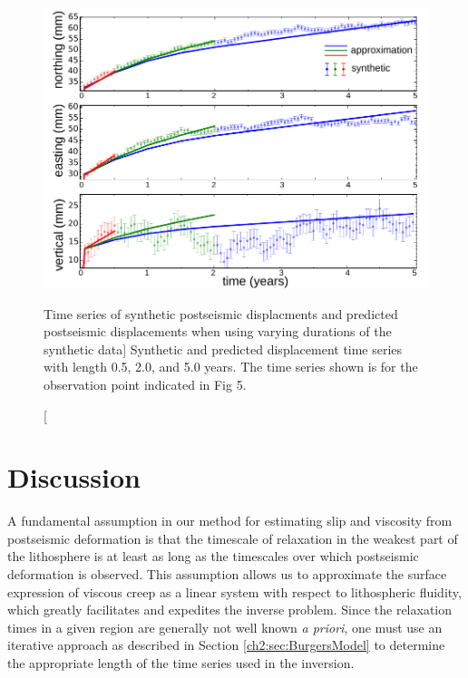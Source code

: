 \begin{figure}
\includegraphics{ch2/figures/Fig10.pdf}
\caption
[Time series of synthetic postseismic displacments and predicted
postseismic displacements when using varying durations of the
synthetic data]
{Synthetic and predicted displacement time series with
length 0.5, 2.0, and 5.0 years.  The time series shown is for the
observation point indicated in Fig 5.}
\label{ch2:fig:10}
\end{figure}

\section{Discussion}
A fundamental assumption in our method for estimating slip and
viscosity from postseismic deformation is that the timescale of
relaxation in the weakest part of the lithosphere is at least as long
as the timescales over which postseismic deformation is observed. This
assumption allows us to approximate the surface expression of viscous
creep as a linear system with respect to lithospheric fluidity, which
greatly facilitates and expedites the inverse problem. Since the
relaxation times in a given region are generally not well known
\textit{a priori}, one must use an iterative approach as described in
Section \ref{ch2:sec:BurgersModel} to determine the appropriate length
of the time series used in the inversion.

